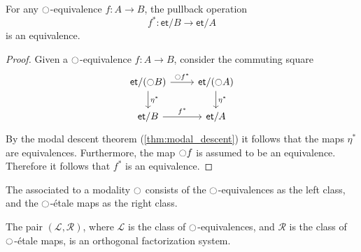 \documentclass[9pt,twosided]{amsart}
\newcommand{\et}{\mathsf{et}}
\begin{document}
\begin{prp}
  For any ${\ocircle}$-equivalence $f:A\to B$, the pullback operation
  \begin{equation*}
    f^\ast : \et/B\to\et/A
  \end{equation*}
  is an equivalence.
\end{prp}

\begin{proof}
  Given a ${\ocircle}$-equivalence $f:A\to B$, consider the commuting square
  \begin{equation*}
    \begin{tikzcd}
      \et/(\modal B) \arrow[r,"\modal f^\ast"] \arrow[d,"\eta^\ast"] & \et/(\modal A) \arrow[d,"\eta^\ast"] \\
      \et/B \arrow[r,"f^\ast"] & \et/A
    \end{tikzcd}
  \end{equation*}
  By the modal descent theorem (\cref{thm:modal_descent}) it follows that the maps $\eta^\ast$ are equivalences. Furthermore, the map ${\ocircle} f$ is assumed to be an equivalence. Therefore it follows that $f^\ast$ is an equivalence.
\end{proof}

\begin{defn}
The  associated to a modality ${\ocircle}$ consists of the ${\ocircle}$-equivalences as the left class, and the ${\ocircle}$-\'etale maps as the right class.
\end{defn}

\begin{thm}\label{thm:rfs_orthogonal}
  The pair $(\mathcal{L},\mathcal{R})$, where $\mathcal{L}$ is the class of ${\ocircle}$-equivalences, and $\mathcal{R}$ is the class of ${\ocircle}$-\'etale maps, is an orthogonal factorization system.
\end{thm}
\end{document}

